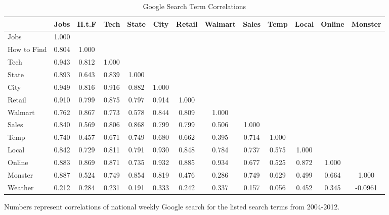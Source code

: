 \documentclass[12pt]{article}
\begin{document}
\begin{spacing}{2}
\begin{appendix}
\begin{sidewaystable}[!htpb]
\centering
\begin{threeparttable}
\caption{Google Search Term Correlations}
\label{tab:termcorrelations}
\begin{tabular}{lcccccccccccc}
\hline
  &Jobs & H.t.F & Tech & State & City & Retail& Walmart & Sales & Temp & Local& Online & Monster \\
\hline
Jobs& 1.000 &&&&&&&&&&&\\
How to Find& 0.804  & 1.000&&&&&&&&&&\\
Tech      &  0.943  & 0.812  & 1.000&&&&&&&&&\\
   State  &  0.893  & 0.643  & 0.839   &1.000&&&&&&&&\\
    City  &   0.949 &  0.816 &  0.916  & 0.882  & 1.000&&&&&&&\\
  Retail  &  0.910  & 0.799  & 0.875  & 0.797 &  0.914 &  1.000&&&&&&\\
 Walmart  &   0.762  & 0.867 &  0.773  & 0.578  & 0.844  & 0.809 &  1.000&&&&&\\
   Sales  &   0.840  & 0.569 &  0.806  & 0.868  & 0.799  & 0.799 &  0.506  & 1.000&&&&\\
    Temp  &   0.740  & 0.457 &  0.671  & 0.749  & 0.680  & 0.662 &  0.395  & 0.714  & 1.000 &&&\\  
   Local  &   0.842  & 0.729 &   0.811 &  0.791 &  0.930 & 0.848 &   0.784 &  0.737 &  0.575&   1.000 &&\\ 
  Online  &   0.883  & 0.869 &  0.871  & 0.735  & 0.932  & 0.885 &  0.934  & 0.677  & 0.525 &  0.872 & 1.000&\\
  Monster &  0.887   & 0.524 & 0.749   & 0.854  & 0.819  & 0.476 & 0.286   & 0.749  & 0.629 & 0.499  & 0.664  & 1.000 \\ 
  Weather &   0.212  & 0.284 &  0.231  & 0.191  & 0.333  & 0.242 &  0.337  & 0.157  & 0.056 &  0.452 & 0.345  & -0.0961 \\
\hline
\end{tabular}
\begin{tablenotes}
\item Numbers represent correlations of national weekly Google search for the listed search terms from 2004-2012.
\end{tablenotes}
\end{threeparttable}
\end{sidewaystable}



\end{appendix}
\end{spacing}
\end{document}
